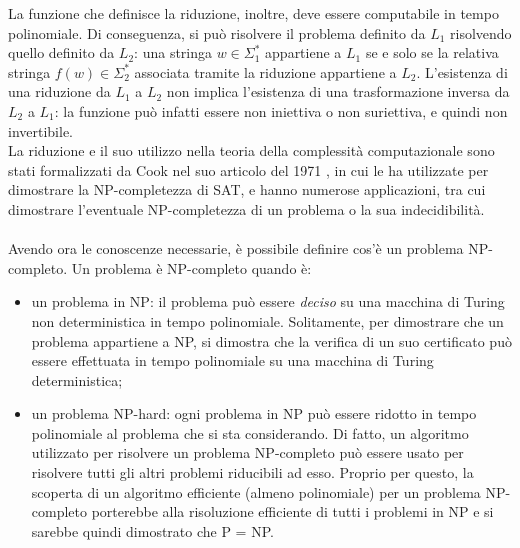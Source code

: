 La funzione che definisce la riduzione, inoltre, deve essere computabile in tempo polinomiale.
Di conseguenza, si può risolvere il problema definito da $L_1$ risolvendo quello definito da $L_2$: una stringa $w \in \Sigma_1^*$
appartiene a $L_1$ se e solo se la relativa stringa $f(w) \in \Sigma_2^*$ associata tramite la riduzione appartiene 
a $L_2$.
L'esistenza di una riduzione da $L_1$ a $L_2$ non implica l'esistenza di una trasformazione inversa da $L_2$ a $L_1$: la funzione
può infatti essere non iniettiva o non suriettiva, e quindi non invertibile.\\
La riduzione e il suo utilizzo nella teoria della complessità computazionale sono stati formalizzati da Cook nel suo articolo
del 1971 \cite{theorem-cook}, in cui le ha utilizzate per dimostrare la NP-completezza di SAT, e hanno numerose applicazioni, tra cui
dimostrare l'eventuale NP-completezza di un problema o la sua indecidibilità.\\ 
\\
Avendo ora le conoscenze necessarie, è possibile definire cos'è un problema NP-completo.
Un problema è NP-completo quando è:
\begin{itemize}
    \item un problema in NP: il problema può essere \textit{deciso} su una macchina di Turing non deterministica
    in tempo polinomiale. Solitamente, per dimostrare che un problema appartiene a NP, si dimostra che la verifica di un suo certificato
    può essere effettuata in tempo polinomiale su una macchina di Turing deterministica;
    \item un problema NP-hard: ogni problema in NP può essere ridotto in tempo polinomiale al problema che si sta considerando.
    Di fatto, un algoritmo utilizzato per risolvere un problema NP-completo può essere usato per risolvere tutti gli altri
    problemi riducibili ad esso. Proprio per questo, la scoperta di un algoritmo
    efficiente (almeno polinomiale) per un problema NP-completo porterebbe alla risoluzione efficiente di tutti i problemi in NP e si sarebbe
    quindi dimostrato che P = NP.
\end{itemize}



